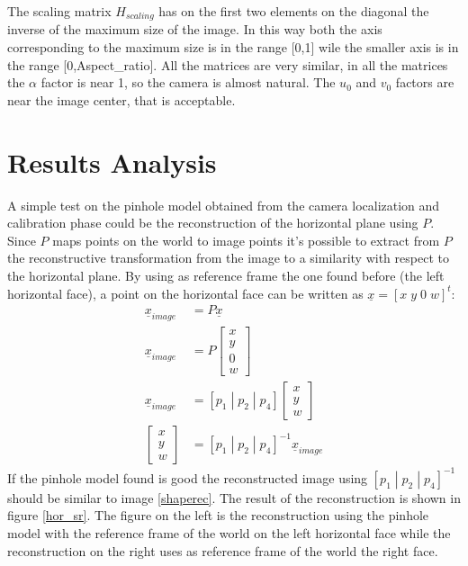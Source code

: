 \documentclass[11pt, oneside]{article}   	%
\begin{document}
The scaling matrix $H_{scaling}$ has on the first two elements on the diagonal the inverse of the maximum size of the image. In this way both the axis corresponding to the maximum size is in the range [0,1] wile the smaller axis is in the range [0,Aspect\_ratio].
All the matrices are very similar, in all the matrices the $\alpha$ factor is near 1, so the camera is almost natural. The $u_0$ and $v_0$ factors are near the image center, that is acceptable.  

\section{Results Analysis}
A simple test on the pinhole model obtained from the camera localization and calibration phase could be the reconstruction of the horizontal plane using $P$.
Since $P$ maps points on the world to image points it's possible to extract from $P$ the reconstructive transformation from the image to a similarity with respect to the horizontal plane.
By using as reference frame the one found before (the left horizontal face), a point on the horizontal face can be written as $\underline{x} = [ x \; y \; 0 \; w]^t$:
\begin{subequations}
\begin{align*}
\underline{x}_{image} &= P\underline{x}  \\
\underline{x}_{image} &= P\begin{bmatrix}
x \\
y \\
0 \\
w
\end{bmatrix} \\
\underline{x}_{image} &= [p_1 \; | \; p_2 \; | \; p_4] \begin{bmatrix}
x \\
y \\
w
\end{bmatrix} \\
\begin{bmatrix}
x \\
y \\
w
\end{bmatrix} &= [p_1 \; |\; p_2\; |\; p_4]^{-1} \underline{x}_{image}
\end{align*}
\end{subequations}
If the pinhole model found is good the reconstructed image using $[p_1 \; |\; p_2\; |\; p_4]^{-1}$ should be similar to image \ref{shaperec}.
The result of the reconstruction is shown in figure \ref{hor_sr}.
The figure on the left is the reconstruction using the pinhole model with the reference frame of the world on the left horizontal face while the reconstruction on the right uses as reference frame of the world the right face.
\end{document}
